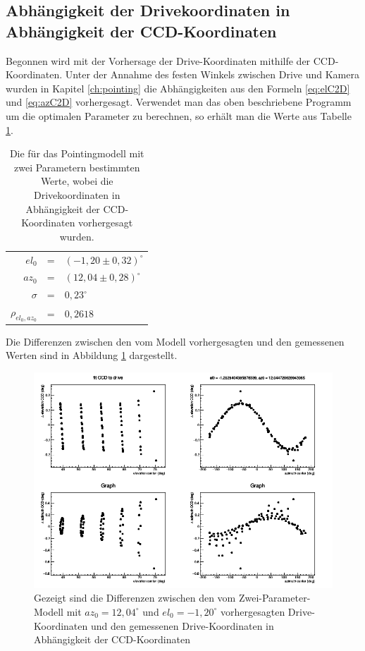\subsection{Abhängigkeit der Drivekoordinaten in Abhängigkeit der CCD-Koordinaten}
Begonnen wird mit der Vorhersage der Drive-Koordinaten mithilfe der CCD-Koordinaten. Unter der Annahme des festen Winkels zwischen Drive und Kamera wurden in Kapitel \ref{ch:pointing} die Abhängigkeiten aus den Formeln \ref{eq:elC2D} und \ref{eq:azC2D} vorhergesagt. Verwendet man das oben beschriebene Programm um die optimalen Parameter zu berechnen, so erhält man die Werte aus Tabelle \ref{tab:C2D}.
\begin{table}[htbp]
\centering
\begin{tabular}{rcl}
\toprule
$el_0$ &=& $(-1,20\pm0,32)^{\circ}$\\
$az_0$ &=& $(12,04\pm0,28)^{\circ}$\\
$\sigma$ &=& $0,23^{\circ}$\\
$\rho_{el_0,az_0}$ &=& $0,2618$\\
\bottomrule
\end{tabular}
\label{tab:C2D}
\caption{Die für das Pointingmodell mit zwei Parametern bestimmten Werte, wobei die Drivekoordinaten in Abhängigkeit der CCD-Koordinaten vorhergesagt wurden.}
\end{table}
Die Differenzen zwischen den vom Modell vorhergesagten und den gemessenen Werten sind in Abbildung \ref{img:C2D} dargestellt.
\begin{figure}[htbp]
\centering
\includegraphics[width=\textwidth]{../341/run341C2D.png}
\caption{Gezeigt sind die Differenzen zwischen den vom Zwei-Parameter-Modell mit $az_0=12,04^{\circ}$ und $el_0=-1,20^{\circ}$ vorhergesagten Drive-Koordinaten und den gemessenen Drive-Koordinaten in Abhängigkeit der CCD-Koordinaten}
\label{img:C2D}
\end{figure}

